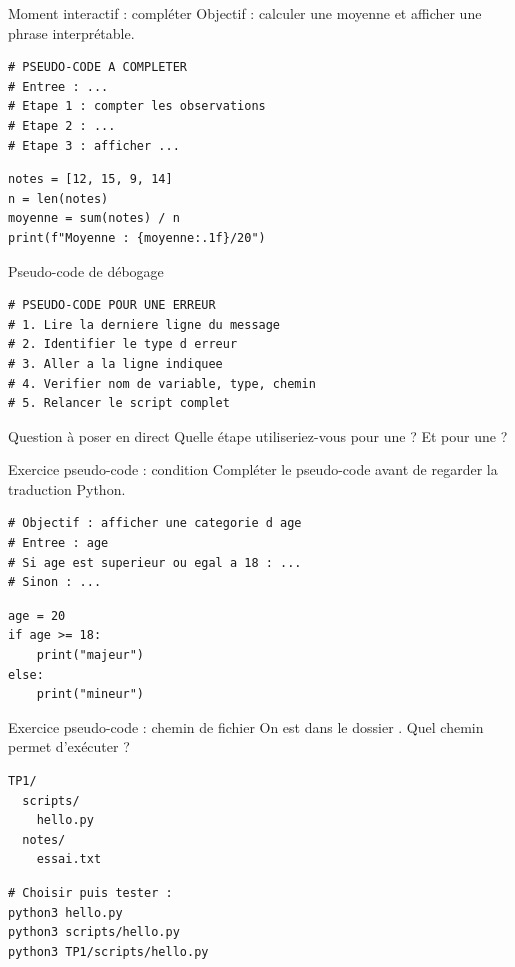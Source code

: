 \documentclass[10pt,aspectratio=169]{beamer}
\begin{document}
\begin{frame}[fragile]{Moment interactif : compléter}
Objectif : calculer une moyenne et afficher une phrase interprétable.
\begin{lstlisting}
# PSEUDO-CODE A COMPLETER
# Entree : ...
# Etape 1 : compter les observations
# Etape 2 : ...
# Etape 3 : afficher ...
\end{lstlisting}
\pause
\begin{lstlisting}
notes = [12, 15, 9, 14]
n = len(notes)
moyenne = sum(notes) / n
print(f"Moyenne : {moyenne:.1f}/20")
\end{lstlisting}
\end{frame}

\begin{frame}[fragile]{Pseudo-code de débogage}
\begin{lstlisting}
# PSEUDO-CODE POUR UNE ERREUR
# 1. Lire la derniere ligne du message
# 2. Identifier le type d erreur
# 3. Aller a la ligne indiquee
# 4. Verifier nom de variable, type, chemin
# 5. Relancer le script complet
\end{lstlisting}
\begin{block}{Question à poser en direct}
Quelle étape utiliseriez-vous pour une  ? Et pour une  ?
\end{block}
\end{frame}


\begin{frame}[fragile]{Exercice pseudo-code : condition}
Compléter le pseudo-code avant de regarder la traduction Python.
\begin{lstlisting}
# Objectif : afficher une categorie d age
# Entree : age
# Si age est superieur ou egal a 18 : ...
# Sinon : ...
\end{lstlisting}
\pause
\begin{lstlisting}
age = 20
if age >= 18:
    print("majeur")
else:
    print("mineur")
\end{lstlisting}
\end{frame}

\begin{frame}[fragile]{Exercice pseudo-code : chemin de fichier}
On est dans le dossier . Quel chemin permet d’exécuter  ?
\begin{lstlisting}
TP1/
  scripts/
    hello.py
  notes/
    essai.txt
\end{lstlisting}
\begin{lstlisting}[language=terminal]
# Choisir puis tester :
python3 hello.py
python3 scripts/hello.py
python3 TP1/scripts/hello.py
\end{lstlisting}
\end{frame}
\end{document}
